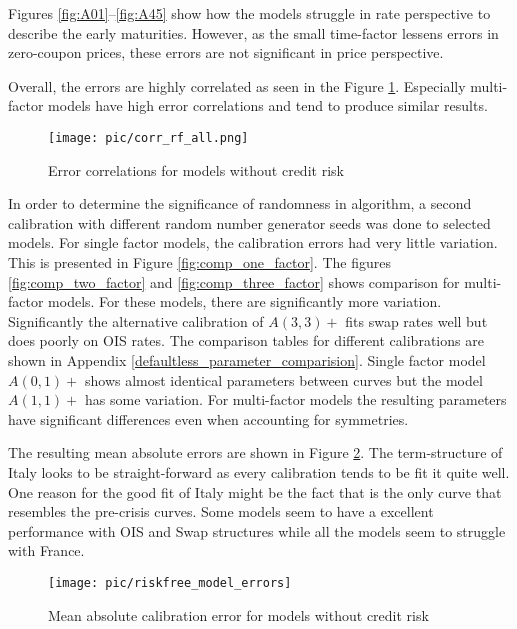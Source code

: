 Figures \ref{fig:A01}--\ref{fig:A45} show how the models struggle in rate perspective to describe the early maturities. However, as the small time-factor lessens errors in zero-coupon prices, these errors are not significant in price perspective.

Overall, the errors are highly correlated as seen in the Figure \ref{fig:creditriskless_error_corr}. Especially multi-factor models have high error correlations and tend to produce similar results.

\begin{figure}[H]
	\centering
	\texttt{[image: pic/corr\_rf\_all.png]}
	\caption{Error correlations for models without credit risk}
	\label{fig:creditriskless_error_corr}
\end{figure}
 
In order to determine the significance of randomness in algorithm, a second calibration with different random number generator seeds was done to selected models. For single factor models, the calibration errors had very little variation. This is presented in Figure \ref{fig:comp_one_factor}. The figures \ref{fig:comp_two_factor} and \ref{fig:comp_three_factor} shows comparison for multi-factor models. For these models, there are significantly more variation. Significantly the alternative calibration of $A(3,3)+$ fits swap rates well but does poorly on OIS rates. The comparison tables for different calibrations are shown in Appendix \ref{defaultless_parameter_comparision}. Single factor model $A(0,1)+$ shows almost identical parameters between curves but the model $A(1,1)+$ has some variation. For multi-factor models the resulting parameters have significant differences even when accounting for symmetries.

The resulting mean absolute errors are shown in Figure \ref{fig:riskfree_model_errors}. The term-structure of Italy looks to be straight-forward as every calibration tends to be fit it quite well. One reason for the good fit of Italy might be the fact that is the only curve that resembles the pre-crisis curves. Some models seem to have a excellent performance with OIS and Swap structures while all the models seem to struggle with France.

\begin{figure}[H]
	\centering
	\texttt{[image: pic/riskfree\_model\_errors]}
	\caption{Mean absolute calibration error for models without credit risk}
	\label{fig:riskfree_model_errors}
\end{figure} 

